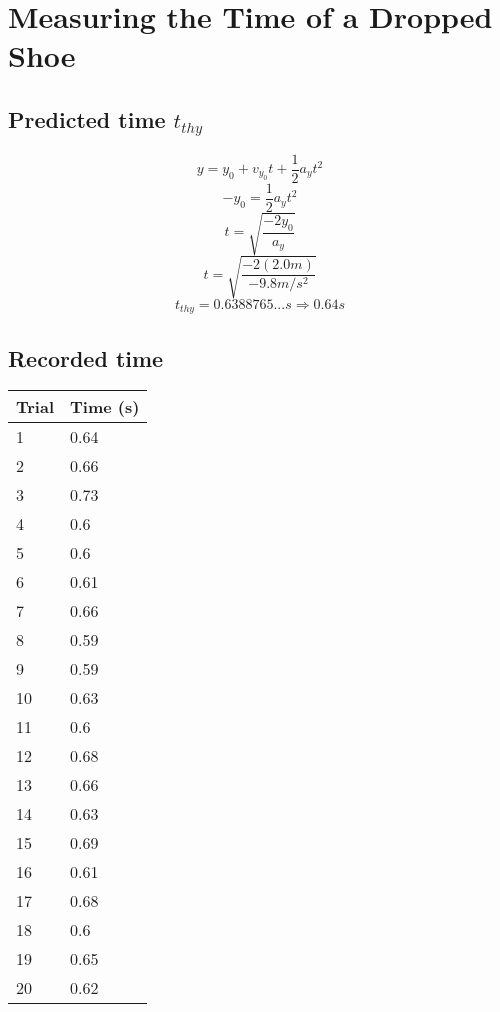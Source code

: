 \documentclass[11pt, letterpaper, includehead]{article}
\begin{document}
\pagebreak 
\section{Measuring the Time of a Dropped Shoe}

\subsection{Predicted time $t_{thy}$} %
$$y       = y_0 + v_{y_0}t + \frac{1}{2}a_yt^2$$
$$-y_0    = \frac{1}{2}a_yt^2$$
$$t       = \sqrt{\frac{-2y_0}{a_y}}$$
$$t       = \sqrt{\frac{-2(2.0m)}{-9.8m/s^2}}$$
$${t_{thy} = 0.6388765...s \Rightarrow  \boxed{0.64s}}$$

\subsection{Recorded time} %
\begin{center}
  \begin{tabular}{|  m{2cm} | m{2cm} | }
    \hline
    \textbf{Trial} & \textbf{Time (s)} \\
    \hline
    1              & 0.64              \\
    \hline
    2              & 0.66              \\
    \hline
    3              & 0.73              \\
    \hline
    4              & 0.6               \\
    \hline
    5              & 0.6               \\
    \hline
    6              & 0.61              \\
    \hline
    7              & 0.66              \\
    \hline
    8              & 0.59              \\
    \hline
    9              & 0.59              \\
    \hline
    10             & 0.63              \\
    \hline
    11             & 0.6               \\
    \hline
    12             & 0.68              \\
    \hline
    13             & 0.66              \\
    \hline
    14             & 0.63              \\
    \hline
    15             & 0.69              \\
    \hline
    16             & 0.61              \\
    \hline
    17             & 0.68              \\
    \hline
    18             & 0.6               \\
    \hline
    19             & 0.65              \\
    \hline
    20             & 0.62              \\
    \hline
  \end{tabular}
\end{center}
\end{document}
